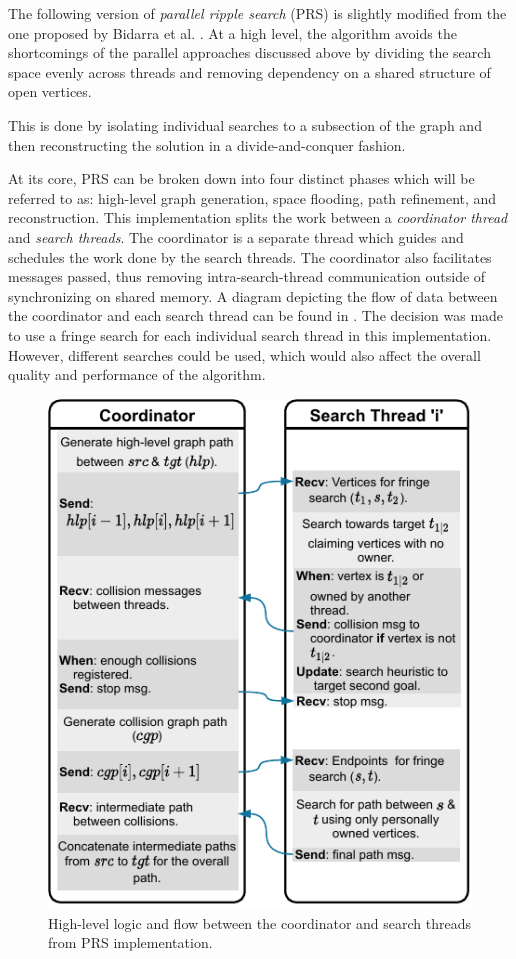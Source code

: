 The following version of \textit{parallel ripple search} (PRS) is slightly modified from the one proposed by Bidarra et al. \cite{PRS}.
At a high level, the algorithm avoids the shortcomings of the parallel approaches discussed above by dividing the search space evenly across threads and removing dependency on a shared structure of open vertices.

This is done by isolating individual searches to a subsection of the graph and then reconstructing the solution in a divide-and-conquer fashion.

At its core,  PRS can be broken down into four distinct phases which will be referred to as: high-level graph generation, space flooding, path refinement, and reconstruction. 
This implementation splits the work between a \textit{coordinator thread} and \textit{search threads}.
The coordinator is a separate thread which guides and schedules the work done by the search threads.
The coordinator also facilitates messages passed, thus removing intra-search-thread communication outside of synchronizing on shared memory.
A diagram depicting the flow of data between the coordinator and each search thread can be found in .
The decision was made to use a fringe search for each individual search thread in this implementation. However, different searches could be used, which would also affect the overall quality and performance of the algorithm.

\begin{figure}[H]
    \centering
    \includegraphics[width=.75\linewidth]{img/prs-flow-2.pdf}
    \caption{High-level logic and flow between the coordinator and search threads from PRS implementation.}
    \label{fig:high_level_flow}
\end{figure}

